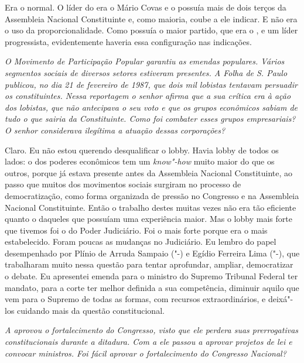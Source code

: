 Era o normal. O líder do  era o Mário Covas e o
 possuía mais de dois terços da Assembleia Nacional Constituinte e,
como maioria, coube a ele indicar. E não era o uso da proporcionalidade.
Como possuía o maior partido, que era o , e um líder progressista,
evidentemente haveria essa configuração nas indicações.

\medskip

\noindent\emph{O Movimento de Participação Popular garantiu as emendas
populares. Vários segmentos sociais de diversos setores estiveram
presentes. A \emph{Folha de S. Paulo} publicou, no dia 21 de fevereiro de 1987,
que dois mil lobistas tentavam persuadir os constituintes. Nessa
reportagem o senhor afirma que a sua crítica era à ação dos lobistas, que
não antecipava o seu voto e que os grupos econômicos sabiam de tudo o
que sairia da Constituinte. Como foi combater esses grupos empresariais?
O senhor considerava ilegítima a atuação dessas corporações?}

Claro. Eu não estou querendo desqualificar o lobby.
Havia lobby de todos os lados: o dos poderes econômicos tem um \emph{know"-how}
muito maior do que os outros, porque já estava presente antes da
Assembleia Nacional Constituinte, ao passo que muitos dos movimentos
sociais surgiram no processo de democratização, como forma organizada de
pressão no Congresso e na Assembleia Nacional Constituinte. Então o
trabalho destes muitas vezes não era tão eficiente quanto o daqueles que
possuíam uma experiência maior. Mas o lobby mais forte que tivemos foi o
do Poder Judiciário. Foi o mais forte porque era o mais estabelecido.
Foram poucas as mudanças no Judiciário. Eu lembro do papel desempenhado
por Plínio de Arruda Sampaio ("-) e Egídio Ferreira Lima ("-),
que trabalharam muito nessa questão para tentar aprofundar, ampliar,
democratizar o debate. Eu apresentei emenda para o ministro do Supremo
Tribunal Federal ter mandato, para a corte ter melhor definida a sua
competência, diminuir aquilo que vem para o Supremo de todas as formas,
com recursos extraordinários, e deixá"-los cuidando mais da questão
constitucional.

\medskip

\noindent\emph{A  aprovou o fortalecimento do Congresso, visto que ele
perdera suas prerrogativas constitucionais durante a ditadura. Com a 
ele passou a aprovar projetos de lei e convocar ministros. Foi fácil
aprovar o fortalecimento do Congresso Nacional?}

